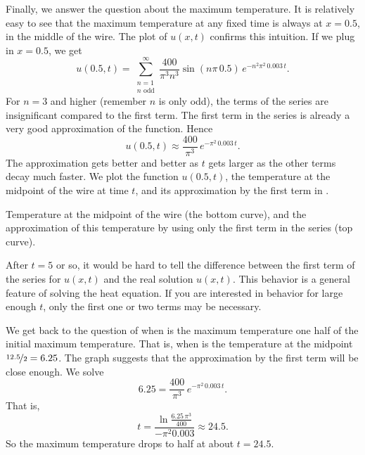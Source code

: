 \begin{example}
Finally, we answer the question about the maximum temperature.  It is
relatively easy to see
that the maximum temperature at any fixed time is always at $x=0.5$, in
the middle of the wire.  The plot of $u(x,t)$ confirms this intuition.
If we plug in $x=0.5$, we get
\begin{equation*}
u(0.5,t) = 
\sum_{\substack{n=1 \\ n \text{ odd}}}^\infty
\frac{400}{\pi^3 n^3}
\sin (n \pi\, 0.5 )
\, e^{-n^2 \pi^2 \, 0.003 \, t} .
\end{equation*}
For $n=3$ and higher (remember $n$ is only odd), the terms
of the series
are insignificant compared to the first term.
The first term in the series is already a very good approximation
of the function.  
Hence 
\begin{equation*}
u(0.5,t) \approx
\frac{400}{\pi^3}
\, e^{-\pi^2 \, 0.003 \, t} .
\end{equation*}
The approximation gets better and better as $t$ gets larger as the other
terms decay much faster.
We plot the function $u(0.5,t)$, the temperature at the midpoint of the wire
at time $t$, and its approximation by the first term
in .

\begin{myfig}
\capstart
{}
\caption{Temperature at the midpoint of the wire (the bottom curve),
and the approximation of this temperature by using only the first term in
the series (top curve).\label{heat:wireexmaxfig}}
\end{myfig}

After $t=5$ or so,
it would be hard to tell the difference
between the first term of the series for $u(x,t)$ and 
the real solution $u(x,t)$.  This behavior
is a general feature of solving the heat equation.
If you are interested in behavior for large enough $t$, only the
first one or two terms may be necessary.

We get back to the question of when is the maximum temperature one half of the
initial maximum temperature.  That is, when is the temperature
at the midpoint $\nicefrac{12.5}{2} = 6.25$.  The graph suggests
that the approximation by the first term will be close enough.  We
solve
\begin{equation*}
6.25 =
\frac{400}{\pi^3}
\, e^{-\pi^2 \, 0.003 \, t} .
\end{equation*}
That is,
\begin{equation*}
t =
\frac{\ln \frac{6.25\,\pi^3}{400}}{-\pi^2 0.003}
\approx 24.5 .
\end{equation*}
So the maximum temperature drops to half at about $t=24.5$.
\end{example}


